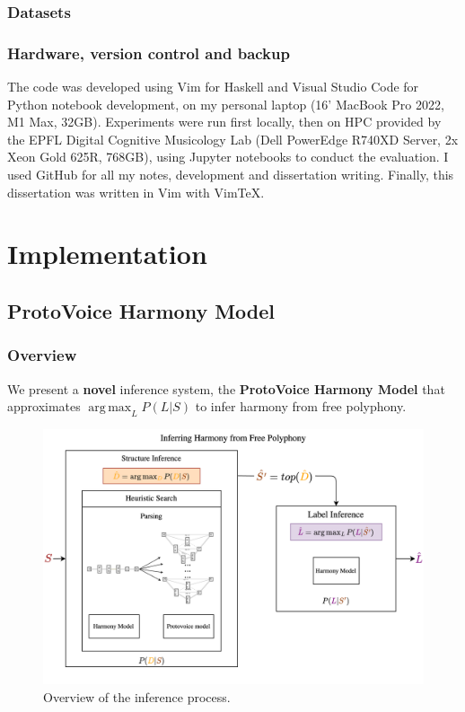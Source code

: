 \documentclass[12pt,a4paper,twoside,openright]{report}
\DeclareMathOperator*{\argmax}{arg\,max}
\theoremstyle{definition}
\begin{document}
\subsection{Datasets}


\subsection{Hardware, version control and backup}
The code was developed using Vim for Haskell and Visual Studio Code for Python notebook development, on my personal laptop (16' MacBook Pro 2022, M1 Max, 32GB). 
Experiments were run first locally, then on HPC provided by the EPFL Digital Cognitive Musicology Lab (Dell PowerEdge R740XD Server, 2x Xeon Gold 625R, 768GB), using Jupyter notebooks to conduct the evaluation. I used GitHub for all my notes, development and dissertation writing. Finally, this dissertation was written in Vim with VimTeX.


\chapter{Implementation}

\section{ProtoVoice Harmony Model}
\subsection{Overview}

We present a \textbf{novel} inference system, the \textbf{ProtoVoice Harmony Model} that approximates $\argmax_L P(L|S)$ to infer harmony from free polyphony.


\begin{figure}[h]
  \centering
  \includegraphics[width=\textwidth]{intro/inferenceOverview}
  \caption{Overview of the inference process.}
  \label{fig:inferenceOverview}
\end{figure}
\end{document}
